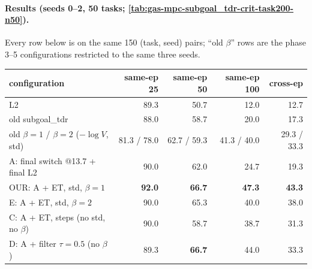 \documentclass[11pt]{article}
\begin{document}
\paragraph{Results (seeds 0--2, 50 tasks; \cref{tab:gas-mpc-subgoal_tdr-crit-task200-n50}).}
Every row below is on the same 150 (task, seed) pairs; ``old $\beta$'' rows are the phase 3--5
configurations restricted to the same three seeds.
\begin{center}\small
\begin{tabular}{lrrrr}
\toprule
configuration & same-ep 25 & same-ep 50 & same-ep 100 & cross-ep \\
\midrule
L2 & 89.3 & 50.7 & 12.0 & 12.7 \\
old subgoal\_tdr & 88.0 & 58.7 & 20.0 & 17.3 \\
old $\beta=1$ / $\beta=2$ ($-\log V$, std) & 81.3 / 78.0 & 62.7 / 59.3 & 41.3 / 40.0 & 29.3 / 33.3 \\
\midrule
A: final switch @13.7 + final L2 & 90.0 & 62.0 & 24.7 & 19.3 \\
OUR: A + ET, std, $\beta=1$ & \textbf{92.0} & \textbf{66.7} & \textbf{47.3} & \textbf{43.3} \\
E: A + ET, std, $\beta=2$ & 90.0 & 65.3 & 40.0 & 38.0 \\
C: A + ET, steps (no std, no $\beta$) & 90.0 & 58.7 & 38.7 & 31.3 \\
D: A + filter $\tau=0.5$ (no $\beta$) & 89.3 & \textbf{66.7} & 44.0 & 33.3 \\
\bottomrule
\end{tabular}
\end{center}
\end{document}
